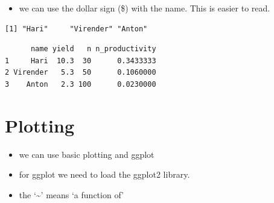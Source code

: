 \documentclass[
  letterpaper,
  DIV=11,
  numbers=noendperiod]{scrreprt}
\newenvironment{Shaded}{\begin{snugshade}}{\end{snugshade}}
\newcommand{\AttributeTok}[1]{\textcolor[rgb]{0.40,0.45,0.13}{#1}}
\newcommand{\CommentTok}[1]{\textcolor[rgb]{0.37,0.37,0.37}{#1}}
\newcommand{\FunctionTok}[1]{\textcolor[rgb]{0.28,0.35,0.67}{#1}}
\newcommand{\NormalTok}[1]{\textcolor[rgb]{0.00,0.23,0.31}{#1}}
\newcommand{\OtherTok}[1]{\textcolor[rgb]{0.00,0.23,0.31}{#1}}
\newcommand{\SpecialCharTok}[1]{\textcolor[rgb]{0.37,0.37,0.37}{#1}}
\newcommand{\StringTok}[1]{\textcolor[rgb]{0.13,0.47,0.30}{#1}}
\providecommand{\tightlist}{%
  \setlength{\itemsep}{0pt}\setlength{\parskip}{0pt}}\usepackage{longtable,booktabs,array}
\begin{document}
\begin{itemize}
\tightlist
\item
  we can use the dollar sign (\$) with the name. This is easier to read.
\end{itemize}

\begin{Shaded}
\end{Shaded}

\begin{verbatim}
[1] "Hari"     "Virender" "Anton"   
\end{verbatim}

\begin{Shaded}
\end{Shaded}

\begin{verbatim}
      name yield   n n_productivity
1     Hari  10.3  30      0.3433333
2 Virender   5.3  50      0.1060000
3    Anton   2.3 100      0.0230000
\end{verbatim}

\hypertarget{plotting}{%
\section{Plotting}\label{plotting}}

\begin{itemize}
\tightlist
\item
  we can use basic plotting and ggplot
\item
  for ggplot we need to load the ggplot2 library.
\item
  the `\textasciitilde{}' means `a function of'
\end{itemize}

\begin{Shaded}
\end{Shaded}
\end{document}
